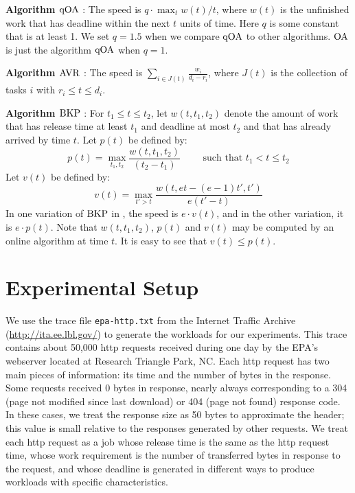\documentclass[11pt]{article}
\newcommand{\BKP}{{\rm BKP}}
\newcommand{\AVR}{{\rm AVR}}
\newcommand{\OA}{{\rm OA}}
\newcommand{\qOA}{{\rm qOA}}
\begin{document}
\medskip
\noindent
{\bf Algorithm \boldmath$\qOA$\unboldmath} \cite{qOA}:
The speed is $q \cdot \max_t w(t)/t$, where
$w(t)$ is the unfinished work that has deadline within the next $t$ 
units of time. Here $q$ is some constant that is at least 1. 
We set $q=1.5$ when we compare $\qOA$ to other algorithms. $\OA$ is
just the algorithm $\qOA$ when $q=1$.

\medskip
\noindent
{\bf Algorithm \boldmath$\AVR$\unboldmath} \cite{YDS}:
The speed is
$\sum_{i \in J(t)} \frac{w_i}{d_i -r_i}$,
where $J(t)$ is the collection of tasks $i$ with $r_i \le t \le d_i$.
\medskip


\medskip
\noindent
{\bf Algorithm \boldmath$\BKP$\unboldmath} \cite{BKP}:
For $t_1 \leq t \leq t_2$, let $w(t,t_1,t_2)$ denote the amount of work that 
has release time at least
$t_1$ and deadline at most $t_2$ and that has already arrived by time $t$.
Let $p(t)$ be defined by:
$$
p(t) = \max_{t_1,t_2} \frac{w(t, t_1,t_2)}{(t_2-t_1)} \qquad \textrm{ such
that $t_1 < t \leq t_2$} $$
Let $v(t)$ be defined by:
$$
v(t) =  \max_{t' > t} \frac{ w(t, e t  -  (e-1) t',t')}{e(t' -t)}
$$
In one variation of $\BKP$ in \cite{BKP}, the speed is $e \cdot v(t)$, and in the other variation, it is
$e \cdot p(t)$. 
Note that $w(t,t_1,t_2)$, $p(t)$ and $v(t)$ may be computed by
an online algorithm at time $t$.
It is easy to see that $v(t) \leq p(t)$. 





\section{Experimental Setup}
\label{sec:setup} 


We use the trace file {\tt epa-http.txt} from the Internet Traffic
Archive (\url{http://ita.ee.lbl.gov/}) to generate the workloads for
our experiments.
This trace contains about 50,000 http requests received during one day
by the EPA's webserver located at Research Triangle Park, NC.
Each http request has two main pieces of information: its time and
the number of bytes in the response.
Some requests received 0 bytes in response, nearly always
corresponding to a 304 (page not modified since last download) or 404
(page not found) response code.
In these cases, we treat the response size as 50 bytes to approximate
the header; this value is small relative to the responses generated by
other requests. 
We treat each http request as a job whose release time is the same as
the http request time, whose work requirement is the number of
transferred bytes in response to the request, and whose deadline is
generated in different ways to produce workloads with specific
characteristics.
\end{document}
